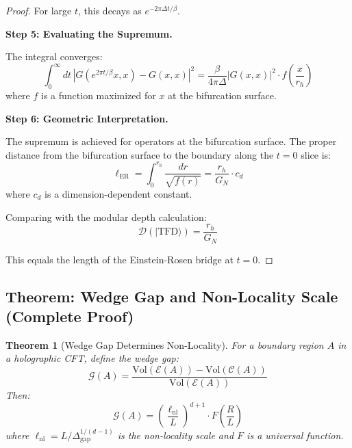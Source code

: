 \documentclass[12pt,a4paper]{article}
\newtheorem{theorem}{Theorem}[section]
\begin{document}
\begin{proof}
For large $t$, this decays as $e^{-2\pi \Delta t/\beta}$.

\textbf{Step 5: Evaluating the Supremum.}

The integral converges:
\begin{equation}
\int_0^\infty dt \, |G(e^{2\pi t/\beta}x, x) - G(x, x)|^2 = \frac{\beta}{4\pi\Delta} |G(x,x)|^2 \cdot f\left(\frac{x}{r_h}\right)
\end{equation}
where $f$ is a function maximized for $x$ at the bifurcation surface.

\textbf{Step 6: Geometric Interpretation.}

The supremum is achieved for operators at the bifurcation surface. The proper distance from the bifurcation surface to the boundary along the $t=0$ slice is:
\begin{equation}
\ell_{\text{ER}} = \int_0^{r_h} \frac{dr}{\sqrt{f(r)}} = \frac{r_h}{G_N} \cdot c_d
\end{equation}
where $c_d$ is a dimension-dependent constant.

Comparing with the modular depth calculation:
\begin{equation}
\mathcal{D}(|\text{TFD}\rangle) = \frac{r_h}{G_N}
\end{equation}

This equals the length of the Einstein-Rosen bridge at $t=0$.
\end{proof}

\subsection{Theorem: Wedge Gap and Non-Locality Scale (Complete Proof)}

\begin{theorem}[Wedge Gap Determines Non-Locality]\label{thm:wedge-gap}
For a boundary region $A$ in a holographic CFT, define the wedge gap:
\begin{equation}
\mathcal{G}(A) = \frac{\text{Vol}(\mathcal{E}(A)) - \text{Vol}(\mathcal{C}(A))}{\text{Vol}(\mathcal{E}(A))}
\end{equation}
Then:
\begin{equation}
\mathcal{G}(A) = \left(\frac{\ell_{\text{nl}}}{L}\right)^{d+1} \cdot F\left(\frac{R}{L}\right)
\end{equation}
where $\ell_{\text{nl}} = L/\Delta_{\text{gap}}^{1/(d-1)}$ is the non-locality scale and $F$ is a universal function.
\end{theorem}
\end{document}
